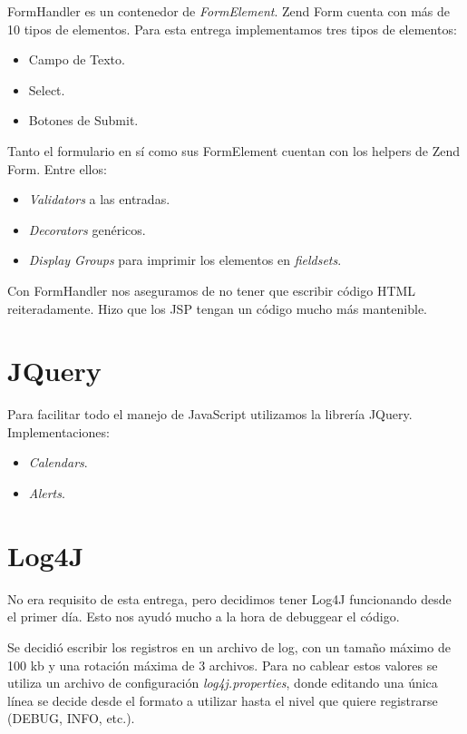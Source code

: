 \documentclass[a4paper,11pt]{article}
\begin{document}
FormHandler es un contenedor de \emph{FormElement}.
Zend Form cuenta con más de 10 tipos de elementos.
Para esta entrega implementamos tres tipos de elementos:

\begin{itemize}
 \item Campo de Texto.
 \item Select.
 \item Botones de Submit.
\end{itemize}

Tanto el formulario en sí como sus FormElement cuentan con los helpers
de Zend Form. Entre ellos:
\begin{itemize}
 \item \emph{Validators} a las entradas.
\item \emph{Decorators} genéricos.
\item \emph{Display Groups} para imprimir los elementos en \emph{fieldsets}.
\end{itemize}

Con FormHandler nos aseguramos de no tener que escribir código
HTML reiteradamente.
Hizo que los JSP tengan un código mucho más mantenible.

\section{JQuery}
Para facilitar todo el manejo de JavaScript utilizamos la librería JQuery.
Implementaciones:
\begin{itemize}
 \item \emph{Calendars}.
\item \emph{Alerts}.
\end{itemize}

\section{Log4J}
No era requisito de esta entrega, pero decidimos tener Log4J funcionando
desde el primer día. Esto nos ayudó mucho a la hora de debuggear el código.


Se decidió escribir los registros en un archivo de log, con un tamaño máximo
de 100 kb y una rotación máxima de 3 archivos. Para no cablear estos valores
se utiliza un archivo de configuración \emph{log4j.properties}, donde editando
una única línea se decide desde el formato a utilizar hasta el nivel que quiere
registrarse (DEBUG, INFO, etc.).
\end{document}

